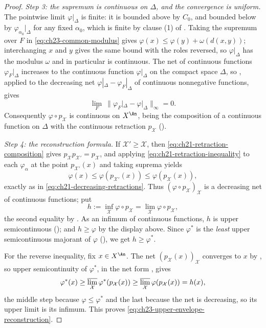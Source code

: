 \begin{proof}
\emph{Step 3: the supremum is continuous on \(\Delta\), and the convergence
is uniform.}  The pointwise limit \(\varphi|_\Delta\) is finite: it is
bounded above by \(C_0\), and bounded below by
\(\varphi_{\alpha_0}|_\Delta\) for any fixed \(\alpha_0\), which is finite
by clause (1) of .  Taking the
supremum over \(F\) in \eqref{eq:ch23-common-modulus} gives
\(\varphi(x)\leq\varphi(y)+\omega(d(x,y))\); interchanging \(x\) and \(y\)
gives the same bound with the roles reversed, so \(\varphi|_\Delta\) has the
modulus \(\omega\) and in particular is continuous.  The net of continuous
functions \(\varphi_F|_\Delta\) increases to the continuous function
\(\varphi|_\Delta\) on the compact space \(\Delta\), so
, applied to the decreasing net
\(\varphi|_\Delta-\varphi_F|_\Delta\) of continuous nonnegative functions,
gives
\begin{equation}\label{eq:ch23-dini-on-skeleton}
 \lim_F\ \bigl\|\varphi_F|_\Delta-\varphi|_\Delta\bigr\|_\infty=0 .
\end{equation}
Consequently \(\varphi\circ p_{\mathcal X}\) is continuous on \(X^{\An}\),
being the composition of a continuous function on \(\Delta\) with the
continuous retraction \(p_{\mathcal X}\)
().

\emph{Step 4: the reconstruction formula.}  If
\(\mathcal X'\geq\mathcal X\), then
\eqref{eq:ch21-retraction-composition} gives
\(p_{\mathcal X}p_{\mathcal X'}=p_{\mathcal X}\), and applying
\eqref{eq:ch21-retraction-inequality} to each \(\varphi_\alpha\) at the point
\(p_{\mathcal X'}(x)\) and taking suprema yields
\[
 \varphi(x)\leq\varphi(p_{\mathcal X'}(x))\leq\varphi(p_{\mathcal X}(x)),
\]
exactly as in \eqref{eq:ch21-decreasing-retractions}.  Thus
\((\varphi\circ p_{\mathcal X})_{\mathcal X}\) is a decreasing net of
continuous functions; put
\[
                        h:=\inf_{\mathcal X}
                             \varphi\circ p_{\mathcal X}
                        =\lim_{\mathcal X}\varphi\circ p_{\mathcal X},
\]
the second equality by .  As an infimum of
continuous functions, \(h\) is upper semicontinuous
(); and \(h\geq\varphi\) by the display above.  Since
\(\varphi^*\) is the \emph{least} upper semicontinuous majorant of
\(\varphi\) (), we get \(h\geq\varphi^*\).

For the reverse inequality, fix \(x\in X^{\An}\).  The net
\((p_{\mathcal X}(x))_{\mathcal X}\) converges to \(x\) by
, so upper semicontinuity of
\(\varphi^*\), in the net form , gives
\begin{equation}\label{eq:ch23-usc-reconstruction-bound}
 \varphi^*(x)
 \geq\varlimsup_{\mathcal X}
           \varphi^*(p_{\mathcal X}(x))
 \geq\varlimsup_{\mathcal X}
           \varphi(p_{\mathcal X}(x))
 =h(x),
\end{equation}
the middle step because \(\varphi\leq\varphi^*\) and the last because the
net is decreasing, so its upper limit is its infimum.  This proves
\eqref{eq:ch23-upper-envelope-reconstruction}.


\end{proof}
